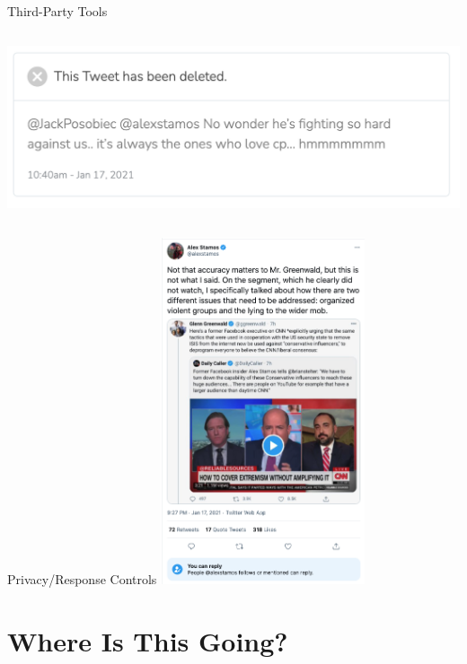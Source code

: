 \documentclass[nobackground,dvipsnames,table,aspectratio=169]{beamer}
\begin{document}
\begin{frame}{Third-Party Tools}
\begin{columns}
            \includegraphics[width=\textwidth]{deleted-harassment-tweet}
    \end{columns}
\end{frame}

\begin{frame}{Privacy/Response Controls}
    \centering
    \includegraphics[width=0.45\textwidth]{greenwald-tweets}
\end{frame}

\section{Where Is This Going?}
\end{document}
